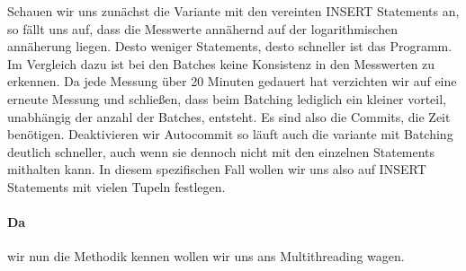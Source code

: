 Schauen wir uns zunächst die Variante mit den vereinten INSERT Statements an, so fällt uns auf, dass die Messwerte annähernd auf der logarithmischen annäherung liegen.
Desto weniger Statements, desto schneller ist das Programm.
Im Vergleich dazu ist bei den Batches keine Konsistenz in den Messwerten zu erkennen.
Da jede Messung über 20 Minuten gedauert hat verzichten wir auf eine erneute Messung und schließen, dass beim Batching lediglich ein kleiner vorteil, unabhängig der anzahl der Batches, entsteht.
Es sind also die Commits, die Zeit benötigen.
Deaktivieren wir Autocommit so läuft auch die variante mit Batching deutlich schneller, auch wenn sie dennoch nicht mit den einzelnen Statements mithalten kann.
In diesem spezifischen Fall wollen wir uns also auf INSERT Statements mit vielen Tupeln festlegen.


\paragraph{Da} wir nun die Methodik kennen wollen wir uns ans Multithreading wagen.
